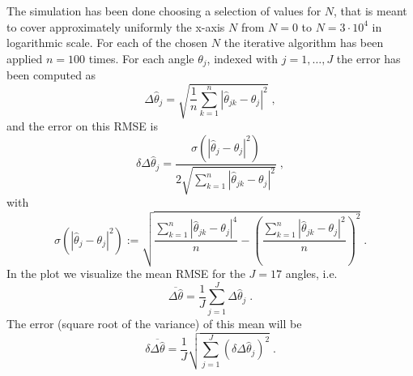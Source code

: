 \documentclass[aps, pra, 10pt, twocolumn, superscriptaddress,floatfix]{revtex4-1}
\begin{document}
%
The simulation has been done choosing a selection of values for $N$, that is meant to cover approximately uniformly the x-axis $N$ from $N=0$ to $N=3 \cdot 10^4$ in logarithmic scale. For each of the chosen $N$ the iterative algorithm has been applied $n = 100$ times. For each angle $\theta_j$, indexed with $j=1, \dots, J$ the error has been computed as
%
\begin{equation}
	\Delta \hat{\theta}_j = \sqrt{\frac{1}{n} \sum \limits_{k=1}^{n} | \hat{\theta}_{jk} - \theta_j |^2} \; ,
\end{equation}
%
and the error on this RMSE is
%
\begin{equation}
	\delta \Delta \hat{\theta}_j = \frac{\sigma \left( | \hat{\theta}_j - \theta_j |^2 \right)}{2 \sqrt{\sum \limits_{k=1}^{n} |\hat{\theta}_{jk} - \theta_j |^2}} \; ,
\end{equation}
%
with 
%
\begin{equation}
	\sigma \left( | \hat{\theta}_j - \theta_j |^2 \right) := \sqrt{\frac{\sum \limits_{k=1}^{n} | \hat{\theta}_{jk} - \theta_j |^4}{n} - \left( \frac{\sum \limits_{k=1}^{n} | \hat{\theta}_{jk} - \theta_j |^2 }{n} \right)^2} \; .
\end{equation}
%
In the plot we visualize the mean RMSE for the $J=17$ angles, i.e.
%
\begin{equation}
	\overline{\Delta \hat{\theta}} = \frac{1}{J} \sum \limits_{j=1}^{J} \Delta \hat{\theta}_j \; .
\end{equation}
%
The error (square root of the variance) of this mean will be
%
\begin{equation}
	\delta \overline{\Delta \hat{\theta}} = \frac{1}{J} \sqrt{\sum \limits_{j=1}^{J} (\delta \Delta \hat{\theta}_j)^2} \; .
	\label{eq:errory}
\end{equation}
%
\end{document}

